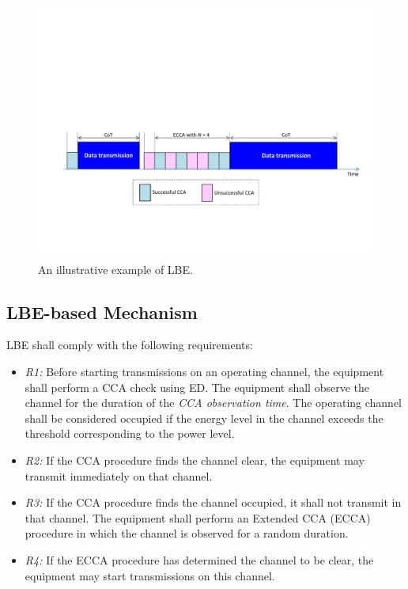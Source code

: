 \begin{itemize}
\begin{figure}[!t]
	\centering
	\includegraphics[width=0.9\columnwidth]{figures2/LBE-example}
	\caption{An illustrative example of LBE.}
	\label{figs:LBE-example}
\end{figure}


\subsection{LBE-based Mechanism}
\label{etsi-lbt:lbe}

LBE shall comply with the following requirements:

\begin{itemize}
	
	\item
	\textit{R1:} Before starting transmissions on an operating channel, the equipment shall perform a CCA check using ED. The equipment shall observe the channel for the duration of the \textit{CCA observation time}. The operating channel shall be considered occupied if the energy level in the channel exceeds the threshold corresponding to the power level.
	
	\item
	\textit{R2:}
	If the CCA procedure finds the channel clear, the equipment may transmit immediately on that channel.
	
	\item
	\textit{R3:}
	If the CCA procedure finds the channel occupied, it shall not transmit in that channel. The equipment shall perform an Extended CCA (ECCA) procedure in which the channel is observed for a random duration.
	
	\item
	\textit{R4:}
	If the ECCA procedure has determined the channel to be clear, the equipment may start transmissions on this channel.
	

\end{itemize}
\end{itemize}
